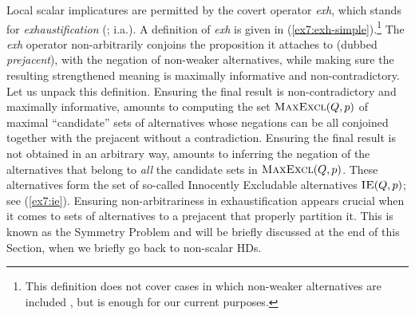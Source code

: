 Local scalar implicatures are permitted by the covert operator \textit{exh}, which stands for \textit{exhaustification} (\cite{Fox2007}; \cite{Chierchia2009} i.a.). A definition of \textit{exh} is given in (\ref{ex7:exh-simple}).\footnote{This definition does not cover cases in which non-weaker alternatives are included \parencite{BarLev2017}, but is enough for our current purposes.} The \textit{exh} operator non-arbitrarily conjoins the proposition it attaches to (dubbed \textit{prejacent}), with the negation of non-weaker alternatives, while making sure the resulting strengthened meaning is maximally informative and non-contradictory. Let us unpack this definition. Ensuring the final result is non-contradictory and maximally informative, amounts to computing the set $\textsc{MaxExcl}(Q, p)$ of maximal ``candidate'' sets of alternatives whose negations can be all conjoined together with the prejacent without a contradiction. Ensuring the final result is not obtained in an arbitrary way, amounts to inferring the negation of the alternatives that belong to \textit{all} the candidate sets in $\textsc{MaxExcl}(Q, p)$. These alternatives form the set of so-called Innocently Excludable alternatives $\textsc{IE}(Q, p)$; see (\ref{ex7:ie}). Ensuring non-arbitrariness in exhaustification appears crucial when it comes to sets of alternatives to a prejacent that properly partition it. This is known as the Symmetry Problem \parencite{Kroch1972,Fox2007} and will be briefly discussed at the end of this Section, when we briefly go back to non-scalar HDs. 


\begin{exe}
	\label{ex7:exh-simple}
	\label{ex7:ie}
\end{exe}



